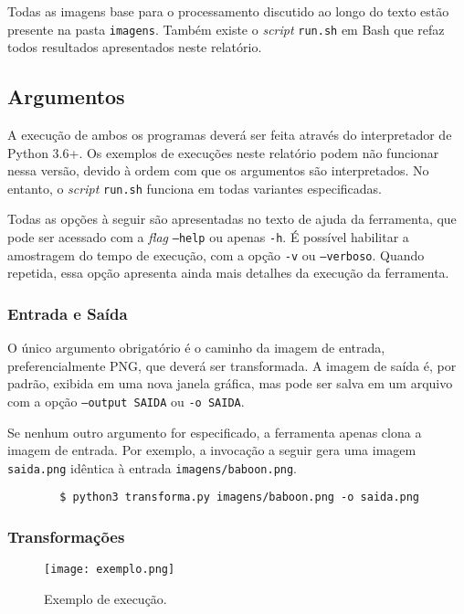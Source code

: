     Todas as imagens base para o processamento discutido ao longo do texto estão presente na pasta \texttt{imagens}. Também existe o \textit{script} \texttt{run.sh} em Bash que refaz todos resultados apresentados neste relatório.

\subsection{Argumentos}

    A execução de ambos os programas deverá ser feita através do interpretador de Python 3.6+. Os exemplos de execuções neste relatório podem não funcionar nessa versão, devido à ordem com que os argumentos são interpretados. No entanto, o \textit{script} \texttt{run.sh} funciona em todas variantes especificadas.

    Todas as opções à seguir são apresentadas no texto de ajuda da ferramenta, que pode ser acessado com a \textit{flag} \texttt{--help} ou apenas \texttt{-h}. É possível habilitar a amostragem do tempo de execução, com a opção \texttt{-v} ou \texttt{--verboso}. Quando repetida, essa opção apresenta ainda mais detalhes da execução da ferramenta.

\subsubsection{Entrada e Saída}

    O único argumento obrigatório é o caminho da imagem de entrada, preferencialmente PNG, que deverá ser transformada. A imagem de saída é, por padrão, exibida em uma nova janela gráfica, mas pode ser salva em um arquivo com a opção \texttt{--output SAIDA} ou \texttt{-o SAIDA}.

    Se nenhum outro argumento for especificado, a ferramenta apenas clona a imagem de entrada. Por exemplo, a invocação a seguir gera uma imagem \texttt{saida.png} idêntica à entrada \texttt{imagens/baboon.png}.

    \begin{verbatim}
        $ python3 transforma.py imagens/baboon.png -o saida.png
    \end{verbatim}

\subsubsection{Transformações}

    \begin{wrapfigure}{L}{0.25\textwidth}
        \centering
        \texttt{[image: exemplo.png]}
        \caption{Exemplo de execução.}
        \label{fig:exemplo}
    \end{wrapfigure}

